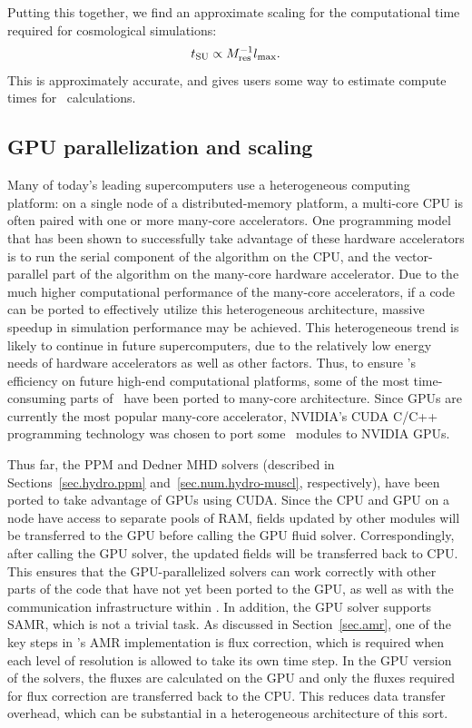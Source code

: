 Putting this together, we find an approximate scaling for the
computational time required for cosmological simulations:
\begin{equation}
t_{\rm SU} \propto M_{\rm res}^{-1} l_{\rm max}.
\end{equation}
This is approximately accurate, and gives users some way to estimate
compute times for \enzo\ calculations.  

\subsection{GPU parallelization and scaling}

Many of today's leading supercomputers use a heterogeneous
computing platform:
on a single node of a distributed-memory platform, a multi-core CPU is
often paired with one or more many-core accelerators.  One programming
model that has been shown to successfully take advantage of these
hardware accelerators is to run the serial component of the algorithm
on the CPU, and the vector-parallel part of the algorithm on the
many-core hardware accelerator. Due to the much higher computational
performance of the many-core accelerators, if a code can be ported to
effectively utilize this heterogeneous architecture, massive speedup
in simulation performance may be achieved.  This heterogeneous trend
is likely to continue in future supercomputers, due to the relatively
low energy needs of hardware accelerators as well as other
factors. Thus, to ensure \enzo's efficiency on future high-end
computational platforms, some of the most time-consuming parts of
\enzo\ have been ported to many-core architecture.  Since GPUs are
currently the most popular many-core accelerator, NVIDIA's CUDA C/C++
programming technology was chosen to port some \enzo\ modules to
NVIDIA GPUs.

Thus far, the PPM and Dedner MHD solvers (described in
Sections~\ref{sec.hydro.ppm} and~\ref{sec.num.hydro-muscl},
respectively), have been ported to take advantage of GPUs using CUDA.
Since the CPU and GPU on a node have access to separate pools of RAM,
fields updated by other modules will be transferred to the GPU before
calling the GPU fluid solver.  Correspondingly, after calling the GPU
solver, the updated fields will be transferred back to CPU. This
ensures that the GPU-parallelized solvers can work correctly with
other parts of the code that have not yet been ported to the GPU, as
well as with the communication infrastructure within \enzo.  In
addition, the GPU solver supports SAMR, which is not a trivial task.
As discussed in Section~\ref{sec.amr}, one of the key steps in \enzo's
AMR implementation is flux correction, which is required when each
level of resolution is allowed to take its own time step.  In the GPU
version of the solvers, the fluxes are calculated on the GPU and only
the fluxes required for flux correction are transferred back to the
CPU.  This reduces data transfer overhead, which can be substantial in
a heterogeneous architecture of this sort.

